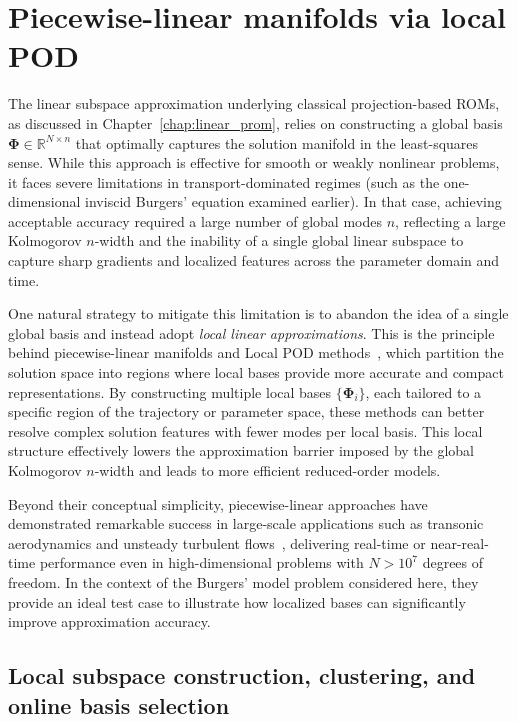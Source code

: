 \section{Piecewise-linear manifolds via local POD}
The linear subspace approximation underlying classical projection-based ROMs, as discussed in Chapter~\ref{chap:linear_prom}, relies on constructing a global basis \( \boldsymbol{\Phi} \in \mathbb{R}^{N \times n} \) that optimally captures the solution manifold in the least-squares sense. While this approach is effective for smooth or weakly nonlinear problems, it faces severe limitations in transport-dominated regimes (such as the one-dimensional inviscid Burgers' equation examined earlier). In that case, achieving acceptable accuracy required a large number of global modes \( n \), reflecting a large Kolmogorov \( n \)-width and the inability of a single global linear subspace to capture sharp gradients and localized features across the parameter domain and time.

One natural strategy to mitigate this limitation is to abandon the idea of a single global basis and instead adopt \emph{local linear approximations}. This is the principle behind piecewise-linear manifolds and Local POD methods~\cite{amsallem2012nonlinear, grimberg2021mesh}, which partition the solution space into regions where local bases provide more accurate and compact representations. By constructing multiple local bases \( \{ \boldsymbol{\Phi}_i \} \), each tailored to a specific region of the trajectory or parameter space, these methods can better resolve complex solution features with fewer modes per local basis. This local structure effectively lowers the approximation barrier imposed by the global Kolmogorov \( n \)-width and leads to more efficient reduced-order models.

Beyond their conceptual simplicity, piecewise-linear approaches have demonstrated remarkable success in large-scale applications such as transonic aerodynamics and unsteady turbulent flows~\cite{washabaugh2016use, grimberg2021mesh}, delivering real-time or near-real-time performance even in high-dimensional problems with \( N > 10^7 \) degrees of freedom. In the context of the Burgers' model problem considered here, they provide an ideal test case to illustrate how localized bases can significantly improve approximation accuracy.

\subsection{Local subspace construction, clustering, and online basis selection}

